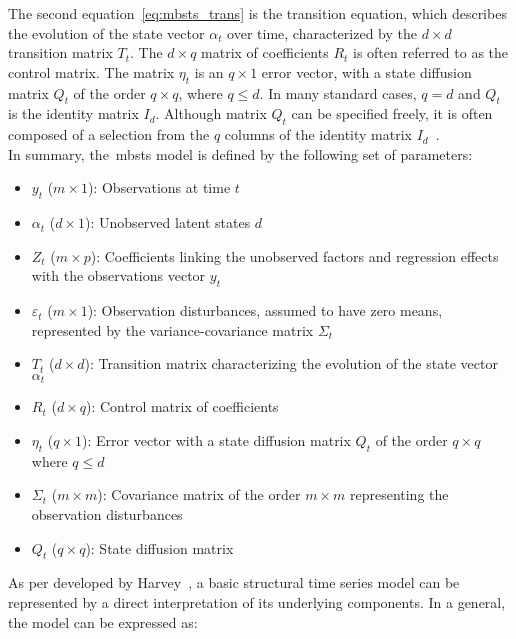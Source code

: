    The second equation~\ref{eq:mbsts_trans} is the transition equation, which describes the evolution of the state vector
    $\alpha_{t}$ over time, characterized by the $d \times d$ transition matrix $T_{t}$.
    The $d \times q$ matrix of coefficients $R_{t}$ is often referred to as the control matrix.
    The matrix $\eta_{t}$ is an $q \times 1$ error vector,
    with a state diffusion matrix $Q_{t}$ of the order $q \times q$, where $q \leq d$.
    In many standard cases, $q = d$ and $Q_{t}$ is the identity matrix $I_{d}$.
    Although matrix $Q_{t}$ can be specified freely,
    it is often composed of a selection from the $q$ columns of the identity matrix $I_{d}$~\cite{commandeur_introduction_2007}.\\

    In summary, the~\gls{mbsts} model is defined by the following set of parameters:

    \begin{itemize}
        \item $y_{t}$ ($m \times 1$): Observations at time $t$
        \item $\alpha_{t}$ ($d \times 1$): Unobserved latent states $d$
        \item $Z_{t}$ ($m \times p$): Coefficients linking the unobserved factors and regression effects
            with the observations vector $y_{t}$
        \item $\varepsilon_{t}$ ($m \times 1$): Observation disturbances, assumed to have zero means,
            represented by the variance-covariance matrix $\Sigma_{t}$
        \item $T_{t}$ ($d \times d$): Transition matrix characterizing the evolution of the state vector $\alpha_{t}$
        \item $R_{t}$ ($d \times q$): Control matrix of coefficients
        \item $\eta_{t}$ ($q \times 1$): Error vector with a state diffusion matrix $Q_{t}$ of the order $q \times q$ where $q \leq d$
        \item $\Sigma_{t}$ ($m \times m$): Covariance matrix of the order $m \times m$ representing the observation disturbances
        \item $Q_{t}$ ($q \times q$): State diffusion matrix
    \end{itemize}

    As per developed by Harvey~\cite{harvey_forecasting_1990}, a basic structural time series model can be represented
    by a direct interpretation of its underlying components.
    In a general, the model can be expressed as:

